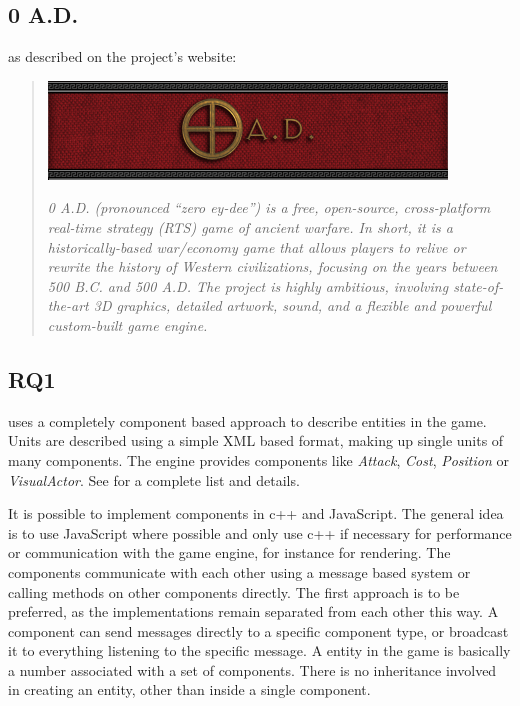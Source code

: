 \subsection{0 A.D.}

\AD{} as described on the project's website:
\begin{quote}
\begin{center}\includegraphics[scale=0.8]{pics/0ad}\end{center}


\textit{0 A.D. (pronounced “zero ey-dee”) is a free, open-source, cross-platform real-time strategy (RTS) game of
ancient warfare. In short, it is a historically-based war/economy game that allows players to relive or rewrite the
history of Western civilizations, focusing on the years between 500 B.C. and 500 A.D. The project is highly ambitious,
involving state-of-the-art 3D graphics, detailed artwork, sound, and a flexible and powerful custom-built game engine.}
\end{quote}

\subsection{RQ1}
\AD{} uses a completely component based approach to describe entities in the game. Units are described using a simple
XML based format, making up single units of many components. The engine provides components like \textit{Attack},
\textit{Cost}, \textit{Position} or \textit{VisualActor}. See \citet[Entity Component Documenation]{0adcomponents} for a
complete list and details. 

It is possible to implement components in c++ and JavaScript. The general idea is to use
JavaScript where possible and only use c++ if necessary for performance or communication with the game engine, for
instance for rendering. The components communicate with each other using a message based system or calling methods on
other components directly. The first approach is to be preferred, as the implementations remain separated from each other
this way. A component can send messages directly to a specific component type, or broadcast it to everything listening to
the specific message. A entity in the game is basically a number associated with a set of components. There is no
inheritance involved in creating an entity, other than inside a single component.

